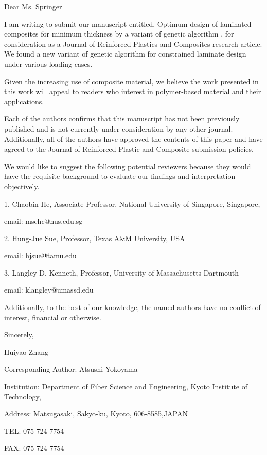\documentclass{article}
\begin{document}
Dear Ms. Springer 

\vskip 0.1in
I am writing to submit our manuscript entitled, Optimum design of laminated
composites for minimum thickness by a variant of genetic algorithm , for
consideration as a Journal of Reinforced Plastics and Composites research
article. We found a new variant of genetic algorithm for constrained laminate
design under various loading cases.


\vskip 0.1in
Given the increasing use of composite material, we believe the work presented in this work will
appeal to readers who interest in polymer-based material and their applications. 

\vskip 0.1in

Each of the authors confirms that this manuscript has not been previously published and is not
currently under consideration by any other journal. Additionally, all of the authors have approved
the contents of this paper and have agreed to the Journal of Reinforced Plastic and Composite submission
policies.

\vskip 0.1in

We would like to suggest the following potential
reviewers because they would have the requisite background to evaluate our findings and
interpretation objectively.

\vskip 0.05in
1.  Chaobin He, Associate Professor, National University of Singapore, Singapore,

	email: msehc@nus.edu.sg 

\vskip 0.02in
2.  Hung-Jue Sue, Professor,  Texas A\&M University, USA 

	email: hjsue@tamu.edu 
\vskip 0.02in

3.  Langley D. Kenneth,  Professor, University of Massachusetts Dartmouth 

	email: klangley@umassd.edu
\vskip 0.05in


Additionally, to the best of our knowledge, the named authors have no conflict of
interest, financial or otherwise.

\vskip 0.15in

Sincerely,

Huiyao Zhang

\vskip 0.2in
Corresponding Author: Atsushi Yokoyama

Institution: Department of Fiber Science and Engineering, Kyoto Institute of Technology,

Address:   Matsugasaki, Sakyo-ku, Kyoto, 606-8585,JAPAN

TEL: 075-724-7754  

FAX:  075-724-7754
\end{document}
